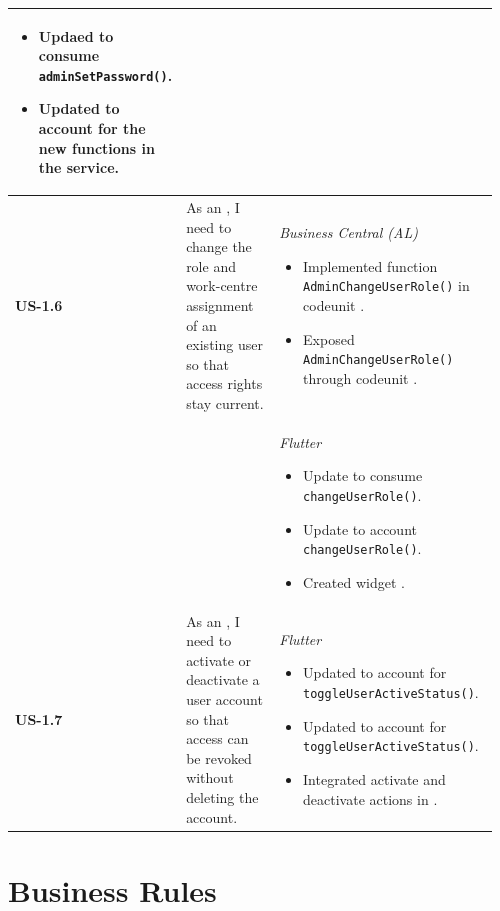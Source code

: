 \begin{longtable}{@{} P{0.09\linewidth} P{0.34\linewidth} P{0.53\linewidth} @{}}
\begin{itemize}[noitemsep, topsep=0pt, partopsep=0pt, leftmargin=*]
		\item Updaed  to consume \texttt{adminSetPassword()}.
		\item Updated  to account for the new functions in the service.
	\end{itemize}\\
	\midrule
	\textbf{US-1.6}
	& As an , I need to change the role and work-centre
	assignment of an existing user so that access rights stay current.
	& \noindent\textit{Business Central (AL)}
	\begin{itemize}[noitemsep, topsep=0pt, partopsep=0pt, leftmargin=*]
		\item Implemented function \texttt{AdminChangeUserRole()} in codeunit .
		\item Exposed \texttt{AdminChangeUserRole()} through codeunit .
	\end{itemize}
\\ & &
	\noindent\textit{Flutter}
	\begin{itemize}[noitemsep, topsep=0pt, partopsep=0pt, leftmargin=*]
		\item Update  to consume \texttt{changeUserRole()}.
		\item Update  to account \texttt{changeUserRole()}.
		\item Created widget .
	\end{itemize}\\
	\midrule
	\textbf{US-1.7}
	& As an , I need to activate or deactivate a user
	account so that access can be revoked without deleting the account.
	& \noindent\textit{Flutter}
	\begin{itemize}[noitemsep, topsep=0pt, partopsep=0pt, leftmargin=*]
		\item Updated   to account for \texttt{toggleUserActiveStatus()}.
		\item Updated   to account for \texttt{toggleUserActiveStatus()}.
		\item Integrated activate and deactivate actions in .
	\end{itemize}\\
\end{longtable}

\section{Business Rules}



